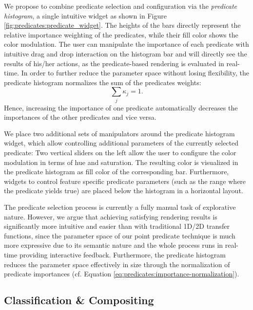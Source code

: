 We propose to combine predicate selection and configuration via the \emph{predicate histogram}, a single intuitive widget as shown in Figure \ref{fig:predicates:predicate_widget}. 
The heights of the bars directly represent the relative importance weighting of the predicates, while their fill color shows the color modulation. 
The user can manipulate the importance of each predicate with intuitive drag and drop interaction on the histogram bar and will directly see the results of his/her actions, as the predicate-based rendering is evaluated in real-time. 
In order to further reduce the parameter space without losing flexibility, the predicate histogram normalizes the sum of the predicates weights:
\begin{equation}
	\sum_j \kappa_j = 1.
	\label{eq:predicates:importance-normalization}
\end{equation}
Hence, increasing the importance of one predicate automatically decreases the importances of the other predicates and vice versa.

We place two additional sets of manipulators around the predicate histogram widget, which allow controlling additional parameters of the currently selected predicate: Two vertical sliders on the left allow the user to configure the color modulation in terms of hue and saturation. 
The resulting color is visualized in the predicate histogram as fill color of the corresponding bar. 
Furthermore, widgets to control feature specific predicate parameters (such as the range where the predicate yields true) are placed below the histogram in a horizontal layout. 

The predicate selection process is currently a fully manual task of explorative nature. 
However, we argue that achieving satisfying rendering results is significantly more intuitive and easier than with traditional 1D/2D transfer functions, since the parameter space of our point predicate technique is much more expressive due to its semantic nature and the whole process runs in real-time providing interactive feedback. 
Furthermore, the predicate histogram reduces the parameter space effectively in size through the normalization of predicate importances (cf. Equation \eqref{eq:predicates:importance-normalization}).


\subsection{Classification \& Compositing}
\label{sec:predicates:compositing}


